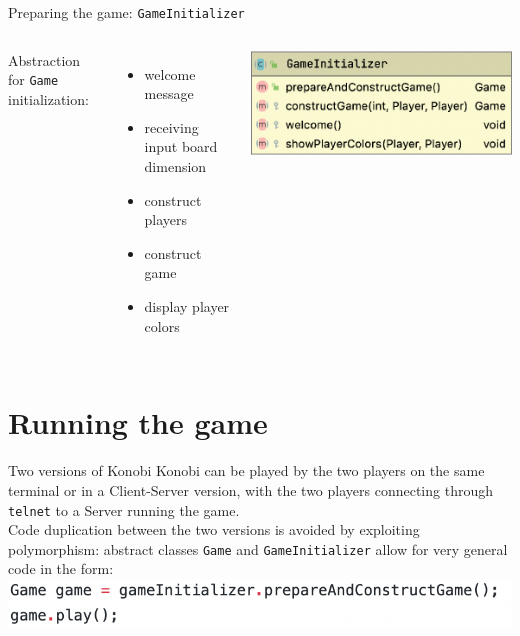 \documentclass{beamer}
\begin{document}
\begin{frame}{Preparing the game: \texttt{GameInitializer}}

 \begin{columns}
    Abstraction for  \texttt{Game} initialization:
   \begin{itemize}
    \item welcome message
    \item receiving input board dimension
    \item construct players
    \item construct game
    \item display player colors
   \end{itemize}
        \includegraphics[scale=0.5]{images/gameinitializer.png}
     \end{columns}
\end{frame}

\section{Running the game}

\begin{frame}{Two versions of Konobi}
Konobi can be played by the two players on the same terminal or in a Client-Server version, with the two players connecting through \texttt{telnet} to a Server running the game.
\\ Code duplication between the two versions is avoided by exploiting polymorphism: abstract classes \texttt{Game} and \texttt{GameInitializer} allow for very general code in the form:
\\
\center \includegraphics[scale=0.5]{images/gameplay.png}
\end{frame}
\end{document}
